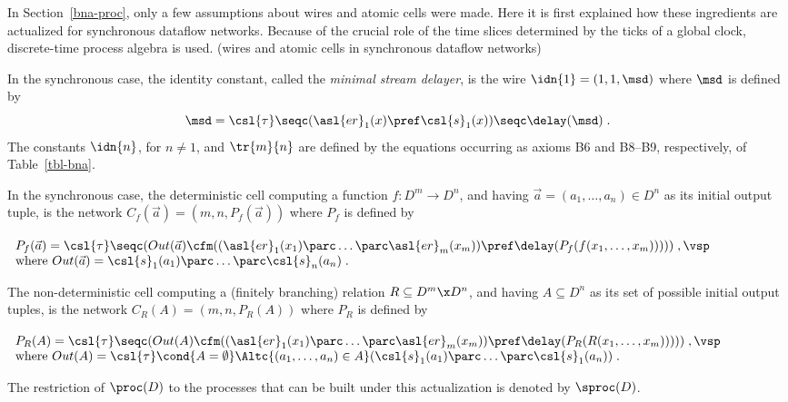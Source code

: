 \documentclass[fleqn]{llncs}
\begin{document}
In Section~\ref{bna-proc}, only a few assumptions about wires and atomic
cells were made.
Here it is first explained how these ingredients are actualized for
synchronous dataflow networks.
Because of the crucial role of the time slices determined by the ticks
of a global clock, discrete-time process algebra is used.
\bdfn (wires and atomic cells in synchronous dataflow networks)
\label{dfn-wires-cells-s}

\noindent
In the synchronous case, the identity constant, called the
{\em minimal stream delayer}, is the wire $\idn{1} = (1,1,\msd)$
where $\msd$ is defined by
$$
\msd =
\csl{\tau} \seqc (\asl{er}_1(x) \pref \csl{s}_1(x)) \seqc \delay(\msd)\;.
$$
The constants $\idn{n}$, for $n \neq 1$, and $\tr{m}{n}$ are defined by
the equations occurring as axioms B6 and B8--B9, respectively, of
Table~\ref{tbl-bna}.

In the synchronous case, the deterministic cell computing a function
$f:D^m \to D^n$, and having $\vec{a} = (a_1,\dots,a_n) \in D^n$ as its
initial output tuple, is the network $C_f(\vec{a}) = (m,n,P_f(\vec{a}))$
where $P_f$ is defined by
\begin{center}
$
\begin{array}[t]{l}
 P_f(\vec{a}) =
 \csl{\tau} \seqc
 (Out(\vec{a}) \cfm
  ((\asl{er}_1(x_1) \parc \dots \parc \asl{er}_m(x_m)) \pref
   \delay(P_f(f(x_1,\dots,x_m)))))\;, \vsp \\
 \mbox{where }
 Out(\vec{a}) =
 \csl{s}_1(a_1) \parc \dots \parc \csl{s}_n(a_n)\;.
\end{array}
$
\end{center}
The non-deterministic cell computing a (finitely branching) relation
$R \subseteq D^m \x D^n$, and having $A \subseteq D^n$ as its set of
possible initial output tuples, is the network $C_R(A) = (m,n,P_R(A))$
where $P_R$ is defined by
\begin{center}
$
\begin{array}[t]{l}
 P_R(A) =
 \csl{\tau} \seqc
 (Out(A) \cfm
  ((\asl{er}_1(x_1) \parc \dots \parc \asl{er}_m(x_m)) \pref
   \delay(P_R(R(x_1,\dots,x_m)))))\;, \vsp \\
 \mbox{where }
 Out(A) =
 \csl{\tau} \cond{A = \emptyset}
 \Altc{(a_1,\dots,a_n) \in A}
  (\csl{s}_1(a_1) \parc \dots \parc \csl{s}_1(a_n))\;.
\end{array}
$
\end{center}

The restriction of $\proc(D)$ to the processes that can be built under
this actualization is denoted by $\sproc(D)$.
\edfn
\end{document}
